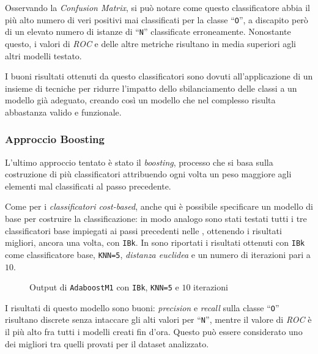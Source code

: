 Osservando la \emph{Confusion Matrix}, si può notare come questo classificatore abbia il più alto numero di veri positivi mai classificati per la classe ``\texttt{O}'',
a discapito però di un elevato numero di istanze di ``\texttt{N}'' classificate erroneamente.
Nonostante questo, i valori di \emph{ROC} e delle altre metriche risultano in media superiori agli altri modelli testato.

I buoni risultati ottenuti da questo classificatori sono dovuti all'applicazione di un insieme di tecniche per ridurre l'impatto dello sbilanciamento delle classi a un modello già adeguato,
creando così un modello che nel complesso risulta abbastanza valido e funzionale.

\subsubsection{Approccio Boosting}

L'ultimo approccio tentato è stato il \emph{boosting}, processo che si basa sulla costruzione di più classificatori attribuendo ogni volta un peso maggiore agli elementi mal classificati al passo precedente.

Come per i \emph{classificatori cost-based}, anche qui è possibile specificare un modello di base per costruire la classificazione:
in modo analogo sono stati testati tutti i tre classificatori base impiegati ai passi precedenti nelle ,
ottenendo i risultati migliori, ancora una volta, con \texttt{IBk}.
In  sono riportati i risultati ottenuti con \texttt{IBk} come classificatore base, \texttt{KNN=5}, \emph{distanza euclidea} e un numero di iterazioni pari a \(10\).

\begin{figure}[H]
  \centering
  \caption{Output di \texttt{AdaboostM1} con \texttt{IBk}, \texttt{KNN=5} e \(10\) iterazioni}%
  \label{fig:adaboost:ibk5}
\end{figure}

I risultati di questo modello sono buoni: \emph{precision} e \emph{recall} sulla classe ``\texttt{O}'' risultano discrete senza intaccare gli alti valori per ``\texttt{N}'',
mentre il valore di \emph{ROC} è il più alto fra tutti i modelli creati fin d'ora. Questo può essere considerato uno dei migliori tra quelli provati per il dataset analizzato.
